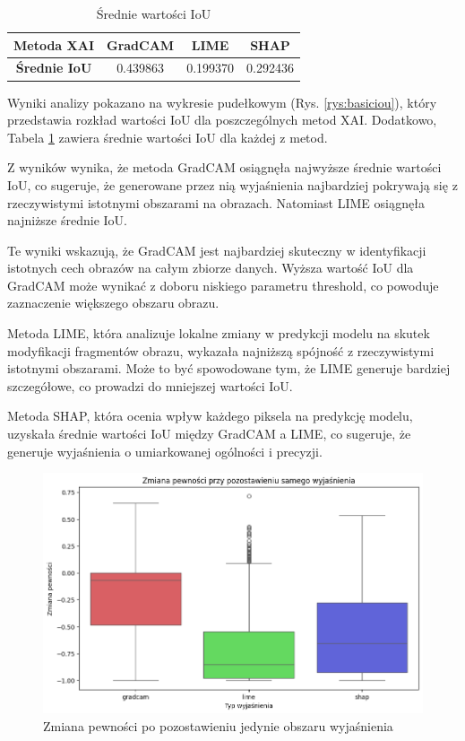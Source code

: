 \begin{table}[h]
	\centering
	\begin{tabular}{|c|c|c|c|}
		\hline
		\textbf{Metoda XAI}  & \textbf{GradCAM} & \textbf{LIME} & \textbf{SHAP} \\
		\hline
		\textbf{Średnie IoU} & 0.439863         & 0.199370      & 0.292436      \\
		\hline
	\end{tabular}
	\caption{Średnie wartości IoU}
	\label{tab:basiciou}
\end{table}

Wyniki analizy pokazano na wykresie pudełkowym (Rys. \ref{rys:basiciou}), który przedstawia rozkład wartości IoU dla poszczególnych metod XAI.
Dodatkowo, Tabela \ref{tab:basiciou} zawiera średnie wartości IoU dla każdej z metod.

Z wyników wynika, że metoda GradCAM osiągnęła najwyższe średnie wartości IoU, co sugeruje, że generowane przez nią wyjaśnienia najbardziej pokrywają się z rzeczywistymi istotnymi obszarami na obrazach.
Natomiast LIME osiągnęła najniższe średnie IoU.

Te wyniki wskazują, że GradCAM jest najbardziej skuteczny w identyfikacji istotnych cech obrazów na całym zbiorze danych.
Wyższa wartość IoU dla GradCAM może wynikać z doboru niskiego parametru threshold, co powoduje zaznaczenie większego obszaru obrazu.

Metoda LIME, która analizuje lokalne zmiany w predykcji modelu na skutek modyfikacji fragmentów obrazu, wykazała najniższą spójność z rzeczywistymi istotnymi obszarami.
Może to być spowodowane tym, że LIME generuje bardziej szczegółowe, co prowadzi do mniejszej wartości IoU.

Metoda SHAP, która ocenia wpływ każdego piksela na predykcję modelu, uzyskała średnie wartości IoU między GradCAM a LIME, co sugeruje, że generuje wyjaśnienia o umiarkowanej ogólności i precyzji.

\begin{figure}[h]
	\centering\includegraphics[width=.9\textwidth]{img/base_confidence_exp}
	\caption{Zmiana pewności po pozostawieniu jedynie obszaru wyjaśnienia}  \label{rys:base_confidence_exp}
\end{figure}


